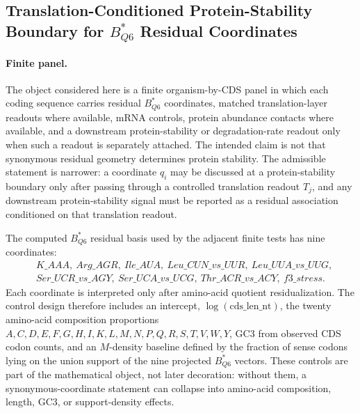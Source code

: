 \subsection{Translation-Conditioned Protein-Stability Boundary for $B^{*}_{Q6}$ Residual Coordinates}\label{sec:q6-translation-conditioned-protein-stability-boundary-cross-layer}

\paragraph{Finite panel.}
The object considered here is a finite organism-by-CDS panel in which each coding sequence carries residual $B^{*}_{Q6}$ coordinates, matched translation-layer readouts where available, mRNA controls, protein abundance contacts where available, and a downstream protein-stability or degradation-rate readout only when such a readout is separately attached. The intended claim is not that synonymous residual geometry determines protein stability. The admissible statement is narrower: a coordinate $q_i$ may be discussed at a protein-stability boundary only after passing through a controlled translation readout $T_j$, and any downstream protein-stability signal must be reported as a residual association conditioned on that translation readout.

The computed $B^{*}_{Q6}$ residual basis used by the adjacent finite tests has nine coordinates:
$$
\begin{aligned}
&K\_AAA,\ Arg\_AGR,\ Ile\_AUA,\ Leu\_CUN\_vs\_UUR,\ Leu\_UUA\_vs\_UUG,\\
&Ser\_UCR\_vs\_AGY,\ Ser\_UCA\_vs\_UCG,\ Thr\_ACR\_vs\_ACY,\ f3\_stress.
\end{aligned}
$$
Each coordinate is interpreted only after amino-acid quotient residualization. The control design therefore includes an intercept, $\log(\mathrm{cds\_len\_nt})$, the twenty amino-acid composition proportions $A,C,D,E,F,G,H,I,K,L,M,N,P,Q,R,S,T,V,W,Y$, GC3 from observed CDS codon counts, and an $M$-density baseline defined by the fraction of sense codons lying on the union support of the nine projected $B^{*}_{Q6}$ vectors. These controls are part of the mathematical object, not later decoration: without them, a synonymous-coordinate statement can collapse into amino-acid composition, length, GC3, or support-density effects.


